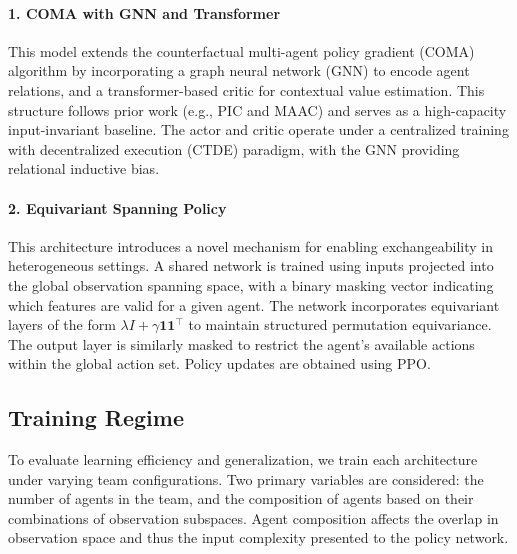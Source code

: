 \paragraph{1. COMA with GNN and Transformer}
This model extends the counterfactual multi-agent policy gradient (COMA) 
algorithm by incorporating a graph neural network (GNN) to encode agent relations, 
and a transformer-based critic for contextual value estimation. 
This structure follows prior work (e.g., PIC and MAAC) and 
serves as a high-capacity input-invariant baseline. 
The actor and critic operate under a centralized training with 
decentralized execution (CTDE) paradigm, with the GNN providing relational inductive bias.

\paragraph{2. Equivariant Spanning Policy}
This architecture introduces a novel mechanism for enabling 
exchangeability in heterogeneous settings. A shared network 
is trained using inputs projected into the global observation 
spanning space, with a binary masking vector indicating which 
features are valid for a given agent. The network incorporates 
equivariant layers of the form $\lambda I + \gamma \mathbf{11}^\top$ 
to maintain structured permutation equivariance. The output layer 
is similarly masked to restrict the agent's available actions 
within the global action set. Policy updates are obtained using PPO.


\subsection{Training Regime}

To evaluate learning efficiency and generalization, 
we train each architecture under varying team configurations. 
Two primary variables are considered: the number of agents in the team, 
and the composition of agents based on their combinations of observation subspaces. 
Agent composition affects the overlap in observation space and thus 
the input complexity presented to the policy network. 

